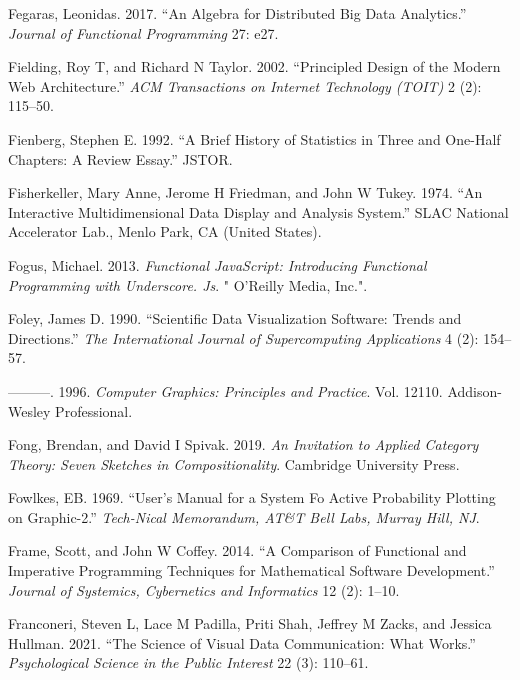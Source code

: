 \documentclass[
  openany]{book}
\newlength{\cslhangindent}
\newenvironment{CSLReferences}[2] %
 {\begin{list}{}{%
  \setlength{\itemindent}{0pt}
  \setlength{\leftmargin}{0pt}
  \setlength{\parsep}{0pt}
  \ifodd #1
   \setlength{\leftmargin}{\cslhangindent}
   \setlength{\itemindent}{-1\cslhangindent}
  \fi
  \setlength{\itemsep}{#2\baselineskip}}}
 {\end{list}}
\theoremstyle{definition}
\theoremstyle{definition}
\theoremstyle{definition}
\theoremstyle{definition}
\theoremstyle{remark}
\begin{document}
\begin{CSLReferences}{1}{0}
Fegaras, Leonidas. 2017. {``An Algebra for Distributed Big Data Analytics.''} \emph{Journal of Functional Programming} 27: e27.

Fielding, Roy T, and Richard N Taylor. 2002. {``Principled Design of the Modern Web Architecture.''} \emph{ACM Transactions on Internet Technology (TOIT)} 2 (2): 115--50.

Fienberg, Stephen E. 1992. {``A Brief History of Statistics in Three and One-Half Chapters: A Review Essay.''} JSTOR.

Fisherkeller, Mary Anne, Jerome H Friedman, and John W Tukey. 1974. {``An Interactive Multidimensional Data Display and Analysis System.''} SLAC National Accelerator Lab., Menlo Park, CA (United States).

Fogus, Michael. 2013. \emph{Functional JavaScript: Introducing Functional Programming with Underscore. Js}. " O'Reilly Media, Inc.".

Foley, James D. 1990. {``Scientific Data Visualization Software: Trends and Directions.''} \emph{The International Journal of Supercomputing Applications} 4 (2): 154--57.

---------. 1996. \emph{Computer Graphics: Principles and Practice}. Vol. 12110. Addison-Wesley Professional.

Fong, Brendan, and David I Spivak. 2019. \emph{An Invitation to Applied Category Theory: Seven Sketches in Compositionality}. Cambridge University Press.

Fowlkes, EB. 1969. {``User's Manual for a System Fo Active Probability Plotting on Graphic-2.''} \emph{Tech-Nical Memorandum, AT\&T Bell Labs, Murray Hill, NJ}.

Frame, Scott, and John W Coffey. 2014. {``A Comparison of Functional and Imperative Programming Techniques for Mathematical Software Development.''} \emph{Journal of Systemics, Cybernetics and Informatics} 12 (2): 1--10.

Franconeri, Steven L, Lace M Padilla, Priti Shah, Jeffrey M Zacks, and Jessica Hullman. 2021. {``The Science of Visual Data Communication: What Works.''} \emph{Psychological Science in the Public Interest} 22 (3): 110--61.


\end{CSLReferences}
\end{document}
